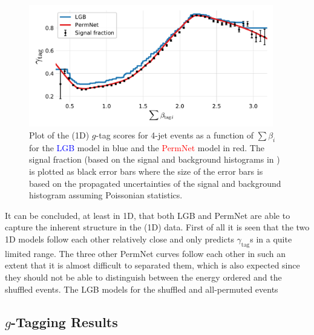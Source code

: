 \begin{figure}
  \centerfloat
  \includegraphics[width=0.95\textwidth, trim=10 10 10 20, clip]{figures/quarks/gtag_sum_models_njet=4-down_sample=1.00-ML_vars=vertex-selection=b-ejet_min=4-n_iter_RS_lgb=99-n_iter_RS_xgb=9-cdot_cut=0.90-version=19.pdf}
  \caption[1D Sum Models Predictions and Signal Fraction for 4-jets events]
          {Plot of the (1D) $g$-tag scores for 4-jet events as a function of $\sum \beta_i$ for the \textcolor{blue}{LGB} model in blue and the \textcolor{red}{PermNet} model in red. The signal fraction (based on the signal and background histograms in ) is plotted as black error bars where the size of the error bars is based on the propagated uncertainties of the signal and background histogram assuming Poissonian statistics. } 
  \label{fig:q:1d_sum_models_signal_fraction_4j}
\end{figure}

It can be concluded, at least in 1D, that both LGB and PermNet are able to capture the inherent structure in the (1D) data. First of all it is seen that the two 1D models follow each other relatively close and only predicts $\gamma_\mathrm{tag}$s in a quite limited range. The three other PermNet curves follow each other in such an extent that it is almost difficult to separated them, which is also expected since they should not be able to distinguish between the energy ordered and the shuffled events. The LGB models for the shuffled and all-permuted events 

\subsection{$g$-Tagging Results}

